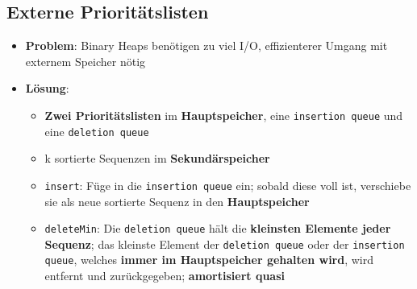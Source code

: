 \subsection{Externe Prioritätslisten}%
\label{ea:sub:externe_prioritaetslisten}

\begin{itemize}
	\item \textbf{Problem}: Binary Heaps benötigen zu viel I/O, effizienterer Umgang mit externem Speicher nötig
	\item \textbf{Lösung}:
	\begin{itemize}
		\item \textbf{Zwei Prioritätslisten} im \textbf{Hauptspeicher}, eine \texttt{insertion queue} und eine \texttt{deletion queue}
		\item k sortierte Sequenzen im \textbf{Sekundärspeicher}
		\item \texttt{insert}: Füge in die \texttt{insertion queue} ein; sobald diese voll ist, verschiebe sie als neue sortierte Sequenz in den \textbf{Hauptspeicher}
		\item \texttt{deleteMin}: Die \texttt{deletion queue} hält die \textbf{kleinsten Elemente jeder Sequenz}; das kleinste Element der \texttt{deletion queue} oder der \texttt{insertion queue}, welches \textbf{immer im Hauptspeicher gehalten wird}, wird entfernt und zurückgegeben; \textbf{amortisiert quasi }
	\end{itemize}
\end{itemize}